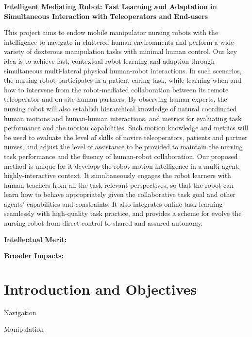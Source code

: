 \documentclass[11pt,letterpaper]{article}
\begin{document}
\begin{center}
    {\bf Intelligent Mediating Robot: Fast Learning and Adaptation in Simultaneous Interaction with Teleoperators and End-users}
\end{center}


\setlength{\parskip}{1mm}
\setlength{\parindent}{0em}
\vspace{-0.2cm}

This project aims to endow mobile manipulator nursing robots with the intelligence to navigate in cluttered human environments and perform a wide variety of dexterous manipulation tasks with minimal human control. Our key idea is to achieve fast, contextual robot learning and adaption through simultaneous multi-lateral physical human-robot interactions. In such scenarios, the nursing robot participates in a patient-caring task, while learning when and how to intervene from the robot-mediated collaboration between its remote teleoperator and on-site human partners. By observing human experts, the nursing robot will also establish hierarchical knowledge of natural coordinated human motions and human-human interactions, and metrics for evaluating task performance and the motion capabilities. Such motion knowledge and metrics will be used to evaluate the level of skills of novice teleoperators, patients and partner nurses, and adjust the level of assistance to be provided to maintain the nursing task performance and the fluency of human-robot collaboration. Our proposed method is unique for it develops the robot motion intelligence in a multi-agent, highly-interactive context. It simultaneously engages the robot learners with human teachers from all the task-relevant perspectives, so that the robot can learn how to behave appropriately given the collaborative task goal and other agents' capabilities and constraints. It also integrates online task learning seamlessly with high-quality task practice, and provides a scheme for evolve the nursing robot from direct control to shared and assured autonomy. 


{\bf Intellectual Merit:}


{\bf Broader Impacts:}

\newpage

\section{Introduction and Objectives}

Navigation

Manipulation
\end{document}
